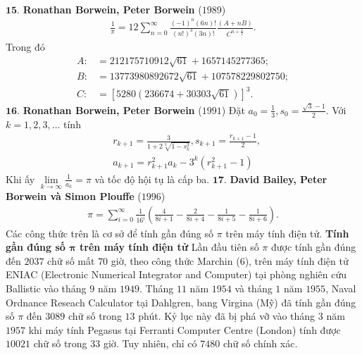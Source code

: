 \begin{multicols}{2}
\begin{align*}
	\end{align*}
	$\pmb{15.}$ \textbf{\color{lichsutoanhoc}Ronathan Borwein, Peter Borwein} ($1989$)
	\begin{align*}
		\frac{1}{\pi } = 12\sum\limits_{n = 0}^\infty  {\frac{{{{\left( { - 1} \right)}^n}\left( {6n} \right)!}}{{{{\left( {n!} \right)}^3}\left( {3n} \right)!}}} \frac{{\left( {A + nB} \right)}}{{{C^{n + \frac{1}{2}}}}}.
	\end{align*}
	Trong đó 
	\begin{align*}
			A\!:\! &\!=\! 212175710912\sqrt {61}  \!+\! 1657145277365;\\
			B\!:\! &\!=\! 13773980892672\sqrt {61}  \!+\! 107578229802750;\\
			C\!:\! &\!=\! {\left[ {5280\left( {236674 + 30303\sqrt {61} } \right)} \right]^3}.
	\end{align*}
	$\pmb{16.}$ \textbf{\color{lichsutoanhoc}Ronathan Borwein, Peter Borwein} ($1991$)
	Đặt $a_0 = \frac{1}{3}, s_0 = \frac{\sqrt{3} -1}{2}$.
	\vskip 0.1cm  
	Với $k = 1,2,3, \ldots$ tính 
	\begin{align*}
		&{r_{k + 1}} = \frac{3}{{1 + 2\sqrt[3]{{1 - s_k^3}}}}, {s_{k + 1}} = \frac{{{r_{k + 1}} - 1}}{2},\\
		&{a_{k + 1}} = r_{k + 1}^2{a_k} - {3^k}\left( {r_{k + 1}^2 - 1} \right)
	\end{align*}
	Khi ấy $\mathop {\lim }\limits_{k \to \infty } \frac{1}{{{a_k}}} = \pi $   và tốc độ hội tụ là cấp ba.
	\vskip 0.1cm
	$\pmb{17.}$ \textbf{\color{lichsutoanhoc}David Bailey, Peter Borwein và Simon Plouffe} ($1996$)
	\begin{align*}
		\pi  \!=\!\!\! \sum\limits_{i = 0}^\infty  {\frac{1}{{{{16}^i}}}\!\!\left(\!\! {\frac{4}{{8i \!+\! 1}} \!-\! \frac{2}{{8i \!+\! 4}} \!-\! \frac{1}{{8i \!+\! 5}} \!-\! \frac{1}{{8i \!+\! 6}}} \!\right).}
	\end{align*}
	Các công thức trên là cơ sở để tính gần đúng số $\pi$  trên máy tính điện tử.
	\vskip 0.1cm
	\textbf{\color{lichsutoanhoc}Tính gần đúng số $\pmb{\pi}$  trên máy tính điện tử}
	\vskip 0.1cm
	Lần đầu tiên số $\pi$  được tính gần đúng đến $2037$ chữ số mất $70$ giờ, theo công thức Marchin ($6$), trên máy tính điện tử ENIAC (Electronic Numerical Integrator and Computer) tại phòng nghiên cứu Ballistic vào tháng $9$ năm $1949$.
	Tháng $11$ năm $1954$ và tháng $1$ năm $1955$, Naval Ordnance Reseach Calculator tại Dahlgren, bang Virgina (Mỹ) đã tính gần đúng số  $\pi$ đến $3089$ chữ số trong $13$ phút.
	\vskip 0.1cm
	Kỷ lục này đã bị phá vỡ vào tháng $3$ năm $1957$ khi máy tính Pegasus tại Ferranti Computer Centre (London) tính được $10021$ chữ số trong $33$ giờ. Tuy nhiên, chỉ có $7480$ chữ số chính xác.

\end{multicols}

